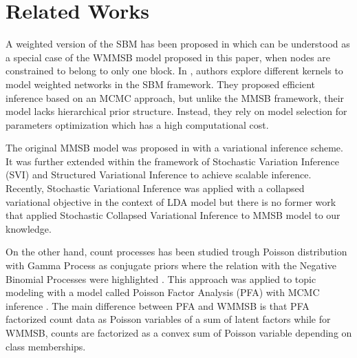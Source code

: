 \section{Related Works}



A weighted version of the SBM has been proposed in \cite{aicher2014learning} which can be understood as a special case of the WMMSB model proposed in this paper, when nodes are constrained to belong to only one block. In \cite{peixoto2018nonparametric}, authors explore different kernels to model weighted networks in the SBM framework. They proposed efficient inference based on an MCMC approach, but unlike the MMSB framework, their model lacks hierarchical prior structure. Instead, they rely on model selection for parameters optimization which has a high computational cost.

The original MMSB model was proposed in \cite{airoldi2009mixed} with a variational inference scheme. It was further extended within the framework of Stochastic Variation Inference (SVI) \cite{gopalan2013efficient} and Structured Variational Inference \cite{kim2013efficient} to achieve scalable inference. Recently, Stochastic Variational Inference was applied with a collapsed variational objective in the context of LDA model \cite{foulds2013stochastic} but there is no former work that applied Stochastic Collapsed Variational Inference to MMSB model to our knowledge.

On the other hand, count processes has been studied trough Poisson distribution with Gamma Process as conjugate priors where the relation with the Negative Binomial Processes were highlighted \cite{zhou2012augment} \cite{zhou2015negative}. This approach was applied to topic modeling with a model called Poisson Factor Analysis (PFA) with MCMC inference \cite{zhou2012beta}. The main difference between PFA and WMMSB is that PFA factorized count data as Poisson variables of a sum of latent factors while for WMMSB, counts are factorized as a convex sum of Poisson variable depending on class memberships.




